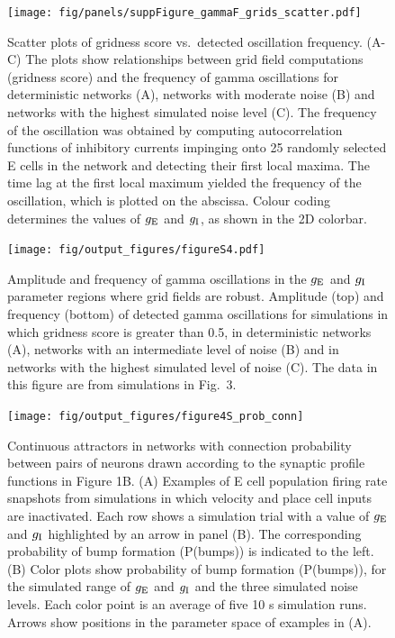 \documentclass[a4paper,12pt]{article}
\newcommand{\ssc}[3]{\ensuremath{#1_{\text{#2}_{\text{#3}}}}}
\newcommand{\gE      }{\ssc{g}      {\scriptsize{E}}{}}
\newcommand{\gI      }{\ssc{g}      {\scriptsize{I}}{}}
\begin{document}
\clearpage

\begin{figure}[ht!]
    \internallinenumbers
    \centering
        \texttt{[image: fig/panels/suppFigure\_gammaF\_grids\_scatter.pdf]}
    \caption{Scatter plots of gridness score vs.\ detected oscillation
    frequency.  (A-C) The plots show relationships between grid field
    computations (gridness score) and the frequency of gamma oscillations for
    deterministic networks (A), networks with moderate noise (B) and networks
    with the highest simulated noise level (C).  The frequency of the
    oscillation was obtained by computing autocorrelation functions of
    inhibitory currents impinging onto 25 randomly selected E cells in the
    network and detecting their first local maxima.  The time lag at the first
    local maximum yielded the frequency of the oscillation, which is plotted on
    the abscissa. Colour coding determines the values of $\gE$ and $\gI$, as
    shown in the 2D colorbar.}
\end{figure}

\clearpage

\begin{figure}[p]
    \internallinenumbers
    \centering
        \texttt{[image: fig/output\_figures/figureS4.pdf]}
    \caption{Amplitude and frequency of gamma oscillations in the $\gE$ and
    $\gI$ parameter regions where grid fields are robust. Amplitude (top) and
    frequency (bottom) of detected gamma oscillations for simulations in which
    gridness score is greater than 0.5, in deterministic networks (A), networks
    with an intermediate level of noise (B) and in networks with the highest
    simulated level of noise (C). The data in this figure are from simulations
    in Fig.~3.}
\end{figure}

\clearpage

\setcounter{figure}{0}
\renewcommand{\figurename}{Figure 4 - figure supplement}

\begin{figure}[p]
    \internallinenumbers
    \centering
        \texttt{[image: fig/output\_figures/figure4S\_prob\_conn]}
    \caption{Continuous attractors in networks with connection probability
    between pairs of neurons drawn according to the synaptic profile functions
    in Figure 1B. (A) Examples of E cell population firing rate snapshots from
    simulations in which velocity and place cell inputs are inactivated. Each
    row shows a simulation trial with a value of $\gE$ and $\gI$ highlighted by an
    arrow in panel (B). The corresponding probability of bump formation
    (P(bumps)) is indicated to the left.  (B) Color plots show probability of
    bump formation (P(bumps)), for the simulated range of $\gE$ and $\gI$ and the
    three simulated noise levels. Each color point is an average of five 10 s
    simulation runs. Arrows show positions in the parameter space of examples
    in (A).}
\end{figure}
\end{document}
